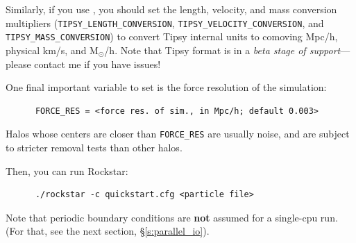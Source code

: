 \documentclass[12pt]{article}
\begin{document}
      Similarly, if you use , you should set the length, velocity, and mass
      conversion multipliers (\texttt{TIPSY\_LENGTH\_CONVERSION},
      \texttt{TIPSY\_VELOCITY\_CONVERSION}, and \texttt{TIPSY\_MASS\_CONVERSION})
      to convert Tipsy internal units to comoving Mpc/h, physical km/s, and M$_\odot$/h.
      Note that Tipsy format is in a \textit{beta stage of support}---please contact
       me if you have issues!
       
       One final important variable to set is the force resolution of the simulation:
\begin{verbatim}
      FORCE_RES = <force res. of sim., in Mpc/h; default 0.003>
\end{verbatim}
	Halos whose centers are closer than \texttt{FORCE\_RES} are usually noise, and are subject to stricter removal tests than other halos.

      Then, you can run Rockstar:
      \begin{verbatim}
      ./rockstar -c quickstart.cfg <particle file>
\end{verbatim}      
      Note that periodic boundary conditions are \textbf{not} assumed for a single-cpu
      run.  (For that, see the next section, \S \ref{s:parallel_io}).
\end{document}
